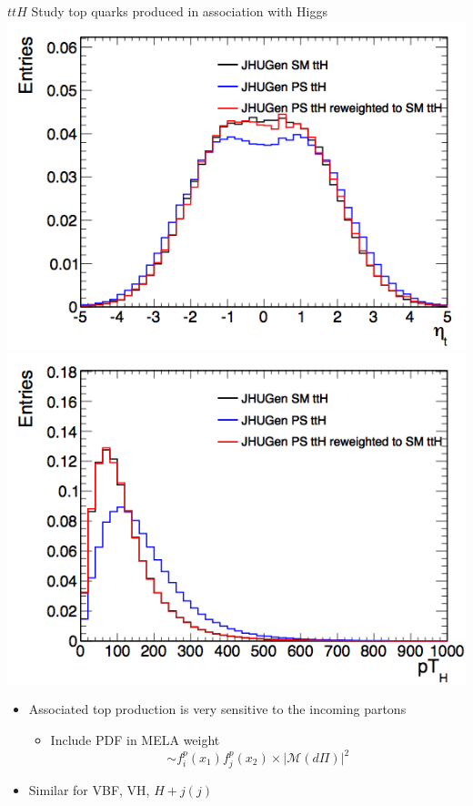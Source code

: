 \documentclass[usenames,dvipsnames,svgnames,table]{beamer}
\begin{document}
\begin{frame}{$ttH$}
Study top quarks produced in association with Higgs
\includegraphics[width=.5\textwidth]{ttH/etatop}
\includegraphics[width=.5\textwidth]{ttH/pTH}
\begin{itemize}
\item Associated top production is very sensitive to the incoming partons
\begin{itemize}[label=$\Rightarrow$]
\item Include PDF in MELA weight
\[
\sim f^p_i\left(x_1\right)f^p_j\left(x_2\right)\times\left|\mathcal{M}\left(d\Pi\right)\right|^2
\]
\end{itemize}
\item Similar for VBF, VH, $H+j\left(j\right)$
\end{itemize}
\end{frame}
\end{document}
